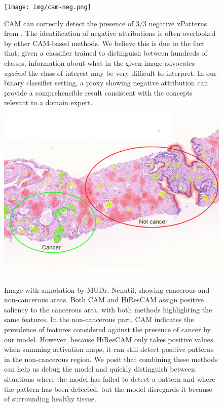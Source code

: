 \begin{figure}
    \begin{center}
    \begin{minipage}{0.8\textwidth}
      {\texttt{[image: img/cam-neg.png]}}
    \end{minipage}
    \caption{
    CAM can correctly detect the presence of $3/3$ negative xPatterns from \cite{gallo}.
    The identification of negative attributions is often overlooked by other CAM-based methods.
    We believe this is due to the fact that, given a classifier trained to distinguish between hundreds of classes, information about what in the given image advocates \emph{against} the class of interest may be very difficult to interpret.
    In our binary classifier setting, a proxy showing negative attribution can provide a comprehensible result consistent with the concepts relevant to a domain expert.
    }
    \label{fig:cam-neg}
    \end{center}
\end{figure}

\begin{figure}
    \begin{center}
    \begin{minipage}{1\textwidth}
      {\includegraphics[width=\textwidth]{img/ruda-annot.png}}
    \end{minipage}
    \caption{
    Image with annotation by MUDr. Nenutil, showing cancerous and non-cancerous areas.
    Both CAM and HiResCAM assign positive saliency to the cancerous area, with both methods highlighting the same features.
    In the non-cancerous part, CAM indicates the prevalence of features considered against the presence of cancer by our model.
    However, because HiResCAM only takes positive values when summing activation maps, it can still detect positive patterns in the non-cancerous region.
    We posit that combining these methods can help us debug the model and quickly distinguish between situations where the model has failed to detect a pattern and where the pattern has been detected, but the model disregards it because of surrounding healthy tissue.
    }
    \label{fig:ruda-annot}
    \end{center}
\end{figure}